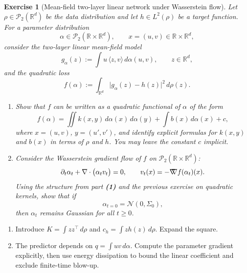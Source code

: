 \documentclass[11pt,a4paper]{article}
\theoremstyle{exostyle}
\newtheorem{exercise}{Exercise}
\newcommand{\R}{\mathbb{R}}
\newcommand{\gradW}{\mathord{\nabla\mkern-9.3mu\nabla}}
\begin{document}
\begin{exercise}[Mean-field two-layer linear network under Wasserstein flow]\label{ex:mf-linear-network}
Let $\rho\in\mathcal P_2(\R^d)$ be the data distribution and let $h\in L^2(\rho)$ be a target function. For a parameter distribution
\[
\alpha \in \mathcal P_2(\R\times\R^d),
\qquad x = (u,v)\in\R\times\R^d,
\]
consider the two-layer linear mean-field model
\[
g_\alpha(z) := \int u\,\langle z,v\rangle\,d\alpha(u,v),
\qquad z\in\R^d,
\]
and the quadratic loss
\[
f(\alpha) := \int_{\R^d} \bigl|g_\alpha(z) - h(z)\bigr|^2\,d\rho(z).
\]

\begin{enumerate}[label=\textbf{(\arabic*)}]
  \item Show that $f$ can be written as a quadratic functional of $\alpha$ of the form
  \[
  f(\alpha)
  = \iint k(x,y)\,d\alpha(x)\,d\alpha(y)
    + \int b(x)\,d\alpha(x) + c,
  \]
  where $x=(u,v)$, $y=(u',v')$, and identify explicit formulas for $k(x,y)$ and $b(x)$ in terms of $\rho$ and $h$. You may leave the constant $c$ implicit.

  \item Consider the Wasserstein gradient flow of $f$ on $\mathcal P_2(\R\times\R^d)$:
  \[
  \partial_t \alpha_t + \nabla\cdot\bigl(\alpha_t v_t\bigr) = 0,
  \qquad
  v_t(x) = -\gradW f(\alpha_t)(x).
  \]
  Using the structure from part \textbf{(1)} and the previous exercise on quadratic kernels, show that if
  \[
  \alpha_{t=0} = \mathcal N(0,\Sigma_0),
  \]
  then $\alpha_t$ remains Gaussian for all $t\ge 0$.
\end{enumerate}
\end{exercise}
\begin{hints}
\begin{enumerate}[label=(\arabic*)]\item Introduce $K=\int zz^\top\,d\rho$ and $c_h=\int zh(z)\,d\rho$. Expand the square.\item The predictor depends on $q=\int uv\,d\alpha$. Compute the parameter gradient explicitly, then use energy dissipation to bound the linear coefficient and exclude finite-time blow-up.\end{enumerate}
\end{hints}
\end{document}
